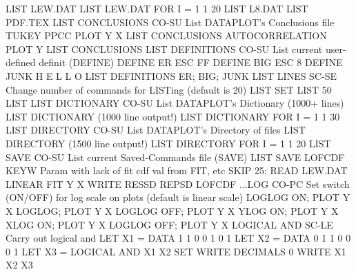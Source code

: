                                   LIST LEW.DAT
                                  LIST LEW.DAT FOR I = 1 1 20
                                  LIST L8.DAT
                                  LIST PDF.TEX
LIST CONCLUSIONS            CO-SU List DATAPLOT's Conclusions file
                                  TUKEY PPCC PLOT Y X
                                  LIST CONCLUSIONS
                                  AUTOCORRELATION PLOT Y
                                  LIST CONCLUSIONS
LIST DEFINITIONS            CO-SU List current user-defined definit (DEFINE)
                                  DEFINE ER ESC FF
                                  DEFINE BIG ESC 8
                                  DEFINE JUNK H E L L O
                                  LIST DEFINITIONS
                                  ER; BIG; JUNK
LIST LINES                  SC-SE Change number of commands for LISTing
                                  (default is 20)
                                  LIST
                                  SET LIST 50
                                  LIST
LIST DICTIONARY             CO-SU List DATAPLOT's Dictionary (1000+ lines)
                                  LIST DICTIONARY  (1000 line output!)
                                  LIST DICTIONARY FOR I = 1 1 30
LIST DIRECTORY              CO-SU List DATAPLOT's Directory of files
                                  LIST DIRECTORY (1500 line output!)
                                  LIST DIRECTORY FOR I = 1 1 20
LIST SAVE                   CO-SU List current Saved-Commands file (SAVE)
                                  LIST SAVE
LOFCDF                      KEYW  Param with lack of fit cdf val from FIT, etc
                                  SKIP 25; READ LEW.DAT
                                  LINEAR FIT Y X
                                  WRITE RESSD REPSD LOFCDF
...LOG                      CO-PC Set switch (ON/OFF) for log scale on plots
                                  (default is linear scale)
                                  LOGLOG ON; PLOT Y X
                                  LOGLOG; PLOT Y X
                                  LOGLOG OFF; PLOT Y X
                                  YLOG ON; PLOT Y X
                                  XLOG ON; PLOT Y X
                                  LOGLOG OFF; PLOT Y X
LOGICAL AND                 SC-LE Carry out logical and
                                  LET X1 = DATA 1 1 0 0 1 0 1
                                  LET X2 = DATA 0 1 1 0 0 0 1
                                  LET X3 = LOGICAL AND X1 X2
                                  SET WRITE DECIMALS 0
                                  WRITE X1 X2 X3
